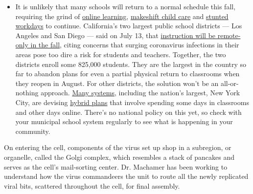 \begin{itemize}
  \begin{itemize}
  \tightlist
  \item
    It is unlikely that many schools will return to a normal schedule
    this fall, requiring the grind of
    \href{https://www.nytimes.com/2020/06/05/us/coronavirus-education-lost-learning.html?action=click\&pgtype=Article\&state=default\&region=MAIN_CONTENT_3\&context=storylines_faq}{online
    learning},
    \href{https://www.nytimes.com/2020/05/29/us/coronavirus-child-care-centers.html?action=click\&pgtype=Article\&state=default\&region=MAIN_CONTENT_3\&context=storylines_faq}{makeshift
    child care} and
    \href{https://www.nytimes.com/2020/06/03/business/economy/coronavirus-working-women.html?action=click\&pgtype=Article\&state=default\&region=MAIN_CONTENT_3\&context=storylines_faq}{stunted
    workdays} to continue. California's two largest public school
    districts --- Los Angeles and San Diego --- said on July 13, that
    \href{https://www.nytimes.com/2020/07/13/us/lausd-san-diego-school-reopening.html?action=click\&pgtype=Article\&state=default\&region=MAIN_CONTENT_3\&context=storylines_faq}{instruction
    will be remote-only in the fall}, citing concerns that surging
    coronavirus infections in their areas pose too dire a risk for
    students and teachers. Together, the two districts enroll some
    825,000 students. They are the largest in the country so far to
    abandon plans for even a partial physical return to classrooms when
    they reopen in August. For other districts, the solution won't be an
    all-or-nothing approach.
    \href{https://bioethics.jhu.edu/research-and-outreach/projects/eschool-initiative/school-policy-tracker/}{Many
    systems}, including the nation's largest, New York City, are
    devising
    \href{https://www.nytimes.com/2020/06/26/us/coronavirus-schools-reopen-fall.html?action=click\&pgtype=Article\&state=default\&region=MAIN_CONTENT_3\&context=storylines_faq}{hybrid
    plans} that involve spending some days in classrooms and other days
    online. There's no national policy on this yet, so check with your
    municipal school system regularly to see what is happening in your
    community.
  \end{itemize}
\end{itemize}

On entering the cell, components of the virus set up shop in a
subregion, or organelle, called the Golgi complex, which resembles a
stack of pancakes and serves as the cell's mail-sorting center. Dr.
Machamer has been working to understand how the virus commandeers the
unit to route all the newly replicated viral bits, scattered throughout
the cell, for final assembly.

